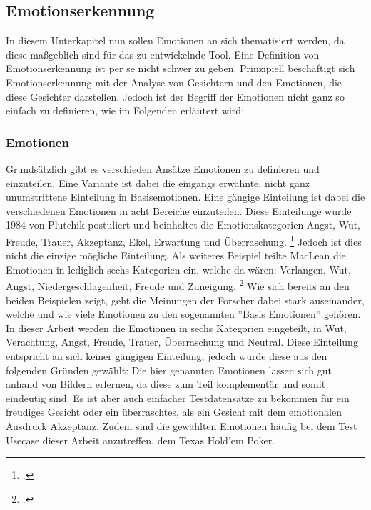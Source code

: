 \documentclass[12pt, a4paper]{report}
\begin{document}
\subsection{Emotionserkennung}
In diesem Unterkapitel nun sollen Emotionen an sich thematisiert werden, da diese maßgeblich sind für das zu entwickelnde Tool. Eine Definition von Emotionserkennung ist per se nicht schwer zu geben. Prinzipiell beschäftigt sich Emotionserkennung mit der Analyse von Gesichtern und den Emotionen, die diese Gesichter darstellen. Jedoch ist der Begriff der Emotionen nicht ganz so einfach zu definieren, wie im Folgenden erläutert wird: 


\subsubsection{Emotionen}

Grundsätzlich gibt es verschieden Ansätze Emotionen zu definieren und einzuteilen. Eine Variante ist dabei die eingangs erwähnte, nicht ganz unumstrittene Einteilung in Basisemotionen. Eine gängige Einteilung ist dabei die verschiedenen Emotionen in acht Bereiche einzuteilen. Diese Einteilunge wurde 1984 von Plutchik postuliert und beinhaltet die Emotionskategorien Angst, Wut, Freude, Trauer, Akzeptanz, Ekel, Erwartung und Überraschung.
\footcite[Vgl. ][3]{FaceRec}
Jedoch ist dies nicht die einzige mögliche Einteilung. Als weiteres Beispiel teilte MacLean die Emotionen in lediglich sechs Kategorien ein, welche da wären: Verlangen, Wut, Angst, Niedergeschlagenheit, Freude und Zuneigung.
\footcite[Vgl. ][3]{FaceRec}
Wie sich bereits an den beiden Beispielen zeigt, geht die Meinungen der Forscher dabei stark auseinander, welche und wie viele Emotionen zu den sogenannten ''Basis Emotionen'' gehören. In dieser Arbeit werden die Emotionen in sechs Kategorien eingeteilt, in Wut, Verachtung, Angst, Freude, Trauer, Überraschung und Neutral. Diese Einteilung entspricht an sich keiner gängigen Einteilung, jedoch wurde diese aus den folgenden Gründen gewählt: \newline
Die hier genannten Emotionen lassen sich gut anhand von Bildern erlernen, da diese zum Teil komplementär und somit eindeutig sind. Es ist aber auch einfacher Testdatensätze zu bekommen für ein
freudiges Gesicht oder ein überraschtes, als ein Gesicht mit dem emotionalen Ausdruck Akzeptanz. Zudem sind die gewählten Emotionen häufig bei dem Test Usecase dieser Arbeit anzutreffen, dem Texas Hold'em Poker.
\end{document}
